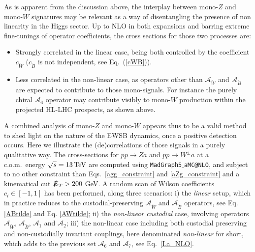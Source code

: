 \documentclass[11pt]{article}
\newcommand{\A}{\mathcal{A}}
\newcommand{\Bt}{{\tilde{B}}}
\newcommand{\Wt}{{\tilde{W}}}
\newcommand{\ETmiss}{\slashed{E}_T}
\renewcommand{\to}{\rightarrow}
\renewcommand{\[}{\begin{equation}}
\renewcommand{\]}{\end{equation}}
\begin{document}
As is apparent from the discussion above, the interplay between mono-$Z$ and mono-$W$ signatures may be relevant as a way of disentangling 
the presence of non linearity in the Higgs sector.  Up to NLO in both expansions and barring extreme fine-tunings of operator coefficients, the cross sections 
for those two processes are:
\begin{itemize}
\item Strongly correlated in the linear case, being both controlled 
by the coefficient $c_{\tilde{W}}$ ($c_{\tilde{B}}$ is not independent, see Eq.~(\ref{cWB})). 
\item Less correlated in the non-linear case, as   operators other than $\A_{\tilde{W}}$ and $\A_{\tilde{B}}$ are expected to contribute to those mono-signals. For instance the purely chiral $\A_6$ operator may contribute visibly to mono-$W$ production within the projected HL-LHC prospects, as shown above.
\end{itemize}
A combined analysis of mono-$Z$ and mono-$W$ appears thus to be a valid method 
to shed light on the nature of the EWSB dynamics, once  a positive detection occurs. 
 Here we illustrate the (de)correlations of those signals in a purely qualitative way. The cross-sections for $pp\to Za$ and $pp\to W^\pm a$ at a c.o.m.~energy $\sqrt{s}=\unit[13]{TeV}$ are computed using {\tt MadGraph5$\_$aMC@NLO}, and subject to no other constraint than Eqs.~\eqref{agg_constraint} and \eqref{aZg_constraint} and a kinematical cut $\ETmiss > 200$ GeV.  A random scan of  Wilson coefficients $c_i \in [-1,1]$ has been performed, along three scenarios: i) the {\it linear} setup, which in practice reduces to the custodial-preserving  $\mathcal{A}_{\Wt}$ and $\mathcal{A}_{\Bt}$ operators, see Eq.\eqref{ABtilde} and Eq. \eqref{AWtilde}; ii)  
the {\it non-linear custodial} case, involving operators $\mathcal{A}_{\Wt}$, $\mathcal{A}_{\Bt}$, $\mathcal{A}_{1}$ and $\mathcal{A}_{2}$; iii) the non-linear case including both custodial preserving and non-custodially invariant couplings,  here denominated {\it non-linear} for short, which adds  to the previous set $\mathcal{A}_{6}$ and $\mathcal{A}_{7}$, see Eq.~\eqref{La_NLO}. 
\end{document}
